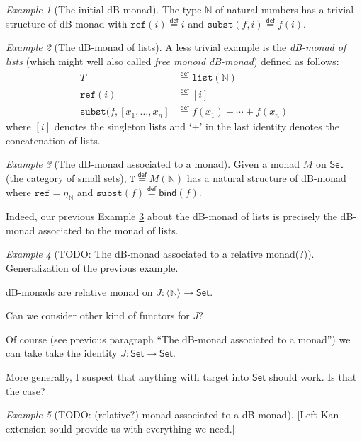 \documentclass[a4paper,twoside,12pt]{article}
\theoremstyle{definition}
\theoremstyle{remark}
\theoremstyle{example}
\newtheorem{example}{Example}
\newcommand{\NN}{\mathbb{N}}
\newcommand{\TT}{\mathtt{T}}
\newcommand{\subst}{\mathtt{subst}}
\newcommand{\refe}{\mathtt{ref}}
\begin{document}
\begin{example}[The initial dB-monad]
  The type $\NN$ of natural numbers has a trivial structure of
  dB-monad with $\refe(i) \stackrel{\mathsf{def}}{=} i$ and
  $\subst(f,i) \stackrel{\mathsf{def}}{=} f(i)$.
\end{example}

\begin{example}[The dB-monad of lists]
  A less trivial example is the \emph{dB-monad of lists} (which might
  well also called \emph{free monoid dB-monad}) defined as follows:
  \begin{align*}
    T &\stackrel{\mathsf{def}}{=}\mathtt{list}(\NN) \\
    \refe(i) &\stackrel{\mathsf{def}}{=} [i] \\
    \subst(f,[x_1, \dots, x_n] &\stackrel{\mathsf{def}}{=} f(x_1) + \cdots + f(x_n)
  \end{align*}
  where $[i]$ denotes the singleton lists and `$+$' in the last
  identity denotes the concatenation of lists.
\end{example}

\begin{example}[The dB-monad associated to a monad]
  \label{ex:list-db-monad}
  Given a monad $M$ on $\mathsf{Set}$ (the category of small sets),
  $\TT \stackrel{\mathsf{def}}{=} M(\NN)$ has a natural structure of
  dB-monad where $\refe = \eta_\NN$ and
  $\subst(f) \stackrel{\mathsf{def}}{=} \mathsf{bind}(f)$.
\end{example}

Indeed, our previous Example \ref{ex:list-db-monad} about the dB-monad
of lists is precisely the dB-monad associated to the monad of lists.

\begin{example}[TODO: The dB-monad associated to a relative monad(?)]
  Generalization of the previous example.

  dB-monads are relative monad on
  $J\colon \langle \NN \rangle \to \mathsf{Set}$.

  Can we consider other kind of functors for $J$?

  Of course (see previous paragraph ``The dB-monad associated to a
  monad'') we can take take the identity
  $J:\mathsf{Set} \to \mathsf{Set}$.

  More generally, I suspect that anything with target into
  $\mathsf{Set}$ should work.  Is that the case?
\end{example}

\begin{example}[TODO: (relative?) monad associated to a dB-monad]
  [Left Kan extension sould provide us with everything we need.]
\end{example}
\end{document}
